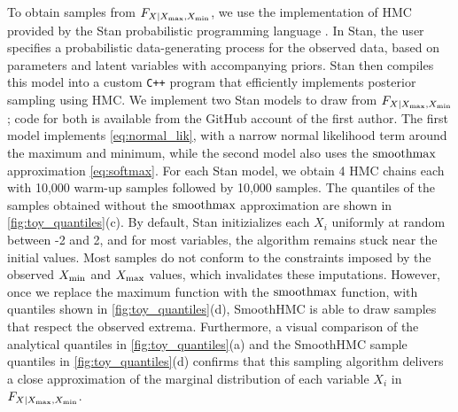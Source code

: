 \documentclass[12pt]{article}
\begin{document}
To obtain samples from \(F_{X \mid X_{\max},X_{\min}}\), we use the implementation of HMC provided by the Stan probabilistic programming language \citep{stancite}.
In Stan, the user specifies a probabilistic data-generating process for the observed data, based on parameters and latent variables with accompanying priors.
Stan then compiles this model into a custom \texttt{C++} program that efficiently implements
posterior sampling using HMC.
We implement two Stan models to draw from \(F_{X \mid X_{\max},X_{\min}}\);
code for both is available from the GitHub account of the first author.
The first model implements \autoref{eq:normal_lik},
with a narrow normal likelihood term around the maximum and minimum,
while the second model also uses the \(\operatorname*{smoothmax}\) approximation \autoref{eq:softmax}.
For each Stan model, we obtain 4 HMC chains each with 10,000 warm-up samples followed by 10,000 samples.
The quantiles of the samples obtained without the \(\operatorname*{smoothmax}\) approximation are shown in \autoref{fig:toy_quantiles}(c).
By default, Stan initizializes each \(X_i\) uniformly at random between -2 and 2,
and for most variables, the algorithm remains stuck near the initial values.
Most samples do not conform to the constraints imposed by the observed \(X_{\min}\) and \(X_{\max}\) values, which invalidates these imputations.
However, once we replace the maximum function with the \(\operatorname*{smoothmax}\) function,
with quantiles shown in \autoref{fig:toy_quantiles}(d),
SmoothHMC is able to draw samples that respect the observed extrema.
Furthermore, a visual comparison of the analytical quantiles in \autoref{fig:toy_quantiles}(a)
and the SmoothHMC sample quantiles in \autoref{fig:toy_quantiles}(d) confirms that
this sampling algorithm delivers a close approximation of the marginal distribution of each variable \(X_i\) in \(F_{X \mid X_{\max},X_{\min}}\).
    
\end{document}
